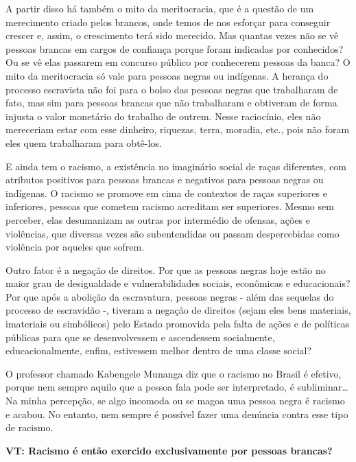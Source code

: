 \documentclass[a4paper,
fontsize=11pt,
oneside,
numbers=noperiodatend,
parskip=half-,
bibliography=totoc,
final
]{scrartcl}
\begin{document}
A partir disso há também o mito da meritocracia, que é a questão de um
merecimento criado pelos brancos, onde temos de nos esforçar para
conseguir crescer e, assim, o crescimento terá sido merecido. Mas
quantas vezes não se vê pessoas brancas em cargos de confiança porque
foram indicadas por conhecidos? Ou se vê elas passarem em concurso
público por conhecerem pessoas da banca? O mito da meritocracia só vale
para pessoas negras ou indígenas. A herança do processo escravista não
foi para o bolso das pessoas negras que trabalharam de fato, mas sim
para pessoas brancas que não trabalharam e obtiveram de forma injusta o
valor monetário do trabalho de outrem. Nesse raciocínio, eles não
mereceriam estar com esse dinheiro, riquezas, terra, moradia, etc., pois
não foram eles quem trabalharam para obtê-los.

E ainda tem o racismo, a existência no imaginário social de raças
diferentes, com atributos positivos para pessoas brancas e negativos
para pessoas negras ou indígenas. O racismo se promove em cima de
contextos de raças superiores e inferiores, pessoas que cometem racismo
acreditam ser superiores. Mesmo sem perceber, elas desumanizam as outras
por intermédio de ofensas, ações e violências, que diversas vezes são
subentendidas ou passam despercebidas como violência por aqueles que
sofrem.

Outro fator é a negação de direitos. Por que as pessoas negras hoje
estão no maior grau de desigualdade e vulnerabilidades sociais,
econômicas e educacionais? Por que após a abolição da escravatura,
pessoas negras - além das sequelas do processo de escravidão -, tiveram
a negação de direitos (sejam eles bens materiais, imateriais ou
simbólicos) pelo Estado promovida pela falta de ações e de políticas
públicas para que se desenvolvessem e ascendessem socialmente,
educacionalmente, enfim, estivessem melhor dentro de uma classe social?

O professor chamado Kabengele Munanga diz que o racismo no Brasil é
efetivo, porque nem sempre aquilo que a pessoa fala pode ser
interpretado, é subliminar\ldots{} Na minha percepção, se algo incomoda
ou se magoa uma pessoa negra é racismo e acabou. No entanto, nem sempre
é possível fazer uma denúncia contra esse tipo de racismo.

\textbf{VT: Racismo é então exercido exclusivamente por pessoas
brancas?}
\end{document}
